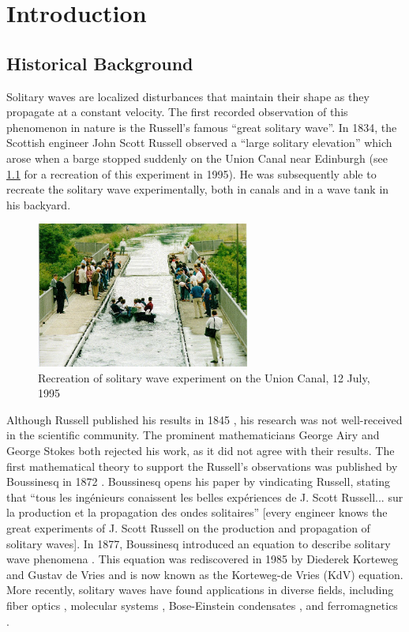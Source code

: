 \documentclass[thesis2.tex]{subfiles}
\begin{document}
\iffulldocument\else
	\chapter{Introduction}
\fi

\section{Historical Background}

Solitary waves are localized disturbances that maintain their shape as they propagate at a constant velocity. The first recorded observation of this phenomenon in nature is the Russell's famous ``great solitary wave''. In 1834, the Scottish engineer John Scott Russell observed a ``large solitary elevation'' which arose when a barge stopped suddenly on the Union Canal near Edinburgh (see \cref{fig:canalwave} for a recreation of this experiment in 1995). He was subsequently able to recreate the solitary wave experimentally, both in canals and in a wave tank in his backyard.  
\begin{figure}
\begin{center}
\includegraphics[width=7cm]{images/intro/solitonHW.jpg}
\caption[Solitary wave experiment]{Recreation of solitary wave experiment on the Union Canal, 12 July, 1995 \cite{Nature1995} }
\label{fig:canalwave}
\end{center}
\end{figure}

Although Russell published his results in 1845 \cite{russell1845}, his research was not well-received in the scientific community. The prominent mathematicians George Airy and George Stokes both rejected his work, as it did not agree with their results. The first mathematical theory to support the Russell's observations was published by Boussinesq in 1872 \cite{Boussinesq1872}. Boussinesq opens his paper by vindicating Russell, stating that ``tous les ing{\'e}nieurs conaissent les belles exp{\'e}riences de J. Scott Russell... sur la production et la propagation des ondes solitaires'' [every engineer knows the great experiments of J. Scott Russell on the production and propagation of solitary waves]. In 1877, Boussinesq introduced an equation to describe solitary wave phenomena \cite{boussinesq1877essai}. This equation was rediscovered in 1985 by Diederek Korteweg and Gustav de Vries \cite{KdVoriginal} and is now known as the Korteweg-de Vries (KdV) equation. More recently, solitary waves have found applications in diverse fields, including fiber optics \cite{Taylor1992}, molecular systems \cite{Davydov1985}, Bose-Einstein condensates \cite{Panos2008BEC}, and ferromagnetics \cite{Kosevich1998}.
\end{document}
